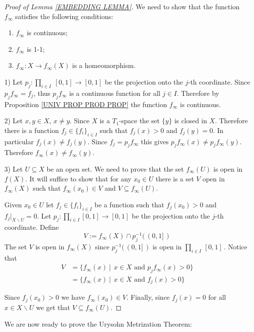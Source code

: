 \documentclass[11pt, letterpaper, oneside]{report}
\theoremstyle{pplain}
\newtheorem{ITERMVALUE THM}[theorem]{Intermediate Value Theorem}
\newtheorem{HEINEBOREL THM}[theorem]{Heine-Borel Theorem}
\newtheorem{UMETR THM}[theorem]{Urysohn Metrization Theorem}
\newtheorem{UMETR2 THM}[theorem]{Urysohn Metrization Theorem (v.2)}
\theoremstyle{ddefinition}
\theoremstyle{nnn}
\newtheorem{TDA NN}[theorem]{Topological Data Analysis. }
\theoremstyle{eexercise}
\newcommand{\ssmin}{\smallsetminus}
\newcommand{\benu}{\begin{enumerate}}
\newcommand{\eenu}{\end{enumerate}}
\begin{document}
\begin{proof}[Proof of Lemma \ref{EMBEDDING LEMMA}]
We need to show that the function $f_{\infty}$ satisfies the following conditions:
\benu
\item $f_{\infty}$ is continuous;
\item $f_{\infty}$ is 1-1;
\item $f_{\infty}\colon X \to f_{\infty}(X)$ is a homeomorphism. 
\eenu

1) Let $p_{j}\colon \prod_{i\in I} \ [0, 1] \to [0, 1]$ be the projection onto the $j$-th coordinate. 
Since $p_{j}f_{\infty} = f_{j}$, thus $p_{j}f_{\infty}$ is a continuous function for all $j\in I$. 
Therefore by Proposition \ref{UNIV PROP PROD PROP} the function $f_{\infty}$ is continuous.   

2) Let $x, y\in X$, $x\neq y$. Since $X$ is a $T_{1}$-space the set $\{y\}$ is 
closed in $X$. Therefore there is a function $f_{j}\in \{f_{i}\}_{i\in I}$
such that $f_{j}(x) > 0$ and $f_{j}(y) = 0$. In particular $f_{j}(x) \neq f_{j}(y)$.  
Since $f_{j} = p_{j}f_{\infty}$ this gives 
$p_{j}f_{\infty}(x) \neq p_{j}f_{\infty}(y)$. Therefore $f_{\infty}(x)\neq f_{\infty}(y)$.

3) Let  $U\subseteq X$ be an open set. We need to prove that the set $f_{\infty}(U)$ is  open 
in $f(X)$.  It will suffice to show that for any  $x_{0}\in U$ there is a set $V$ open in $f_{\infty}(X)$
such that  $f_{\infty}(x_{0})\in V$  and $V\subseteq f_{\infty}(U)$.

Given $x_{0}\in U$ let $f_{j}\in \{f_{i}\}_{i\in I}$ be a function such that $f_{j}(x_{0}) > 0$
and $f_{j}|_{X\ssmin U} = 0$.   
Let $p_{j}\colon \prod_{i\in I} [0, 1] \to [0, 1]$ be the projection onto the $j$-th coordinate. 
Define 
$$V:= f_{\infty}(X)\cap p_{j}^{-1}(\, (0, 1]\, )$$ 
The set $V$ is open in $f_{\infty}(X)$ since $ p_{j}^{-1}(\, (0, 1]\, )$ is open in $ \prod_{i\in I} \, [0, 1]\, $.
Notice that 
\begin{align*}
V & = \{f_{\infty}(x) \ | \ \ x\in X \text{ and } p_{j}f_{\infty}(x) > 0  \}  \\
& = \{f_{\infty}(x) \ | \ \ x\in X \text{ and } f_{j}(x) > 0  \} 
\end{align*}

Since $f_{j}(x_{0}) >0$ we have $f_{\infty}(x_{0}) \in V$. Finally, since $f_{j}(x) = 0$  for all $x\in X \ssmin U$
we get that $V\subseteq f_{\infty}(U)$.
\end{proof} 


We are now ready to prove the Urysohn Metrization Theorem:
\end{document}
